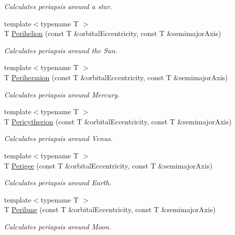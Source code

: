 \begin{DoxyCompactItemize}
\begin{DoxyCompactList}\small\item\em Calculates periapsis around a star. \end{DoxyCompactList}\item 
{\footnotesize template$<$typename T $>$ }\\T \hyperlink{group___periapsis_ga941d285e3a0b48ada9c9f60925ff63c2}{Perihelion} (const T \&orbital\+Eccentricity, const T \&semimajor\+Axis)
\begin{DoxyCompactList}\small\item\em Calculates periapsis around the Sun. \end{DoxyCompactList}\item 
{\footnotesize template$<$typename T $>$ }\\T \hyperlink{group___periapsis_ga9562e9cbfd73019ae9cdaa643b843d63}{Perihermion} (const T \&orbital\+Eccentricity, const T \&semimajor\+Axis)
\begin{DoxyCompactList}\small\item\em Calculates periapsis around Mercury. \end{DoxyCompactList}\item 
{\footnotesize template$<$typename T $>$ }\\T \hyperlink{group___periapsis_gaa270e364cbbd7d3d6212872df484926f}{Pericytherion} (const T \&orbital\+Eccentricity, const T \&semimajor\+Axis)
\begin{DoxyCompactList}\small\item\em Calculates periapsis around Venus. \end{DoxyCompactList}\item 
{\footnotesize template$<$typename T $>$ }\\T \hyperlink{group___periapsis_gae2d053caf69cb0b4c3207064a2ab143a}{Perigee} (const T \&orbital\+Eccentricity, const T \&semimajor\+Axis)
\begin{DoxyCompactList}\small\item\em Calculates periapsis around Earth. \end{DoxyCompactList}\item 
{\footnotesize template$<$typename T $>$ }\\T \hyperlink{group___periapsis_ga2cc7ab05e18d32c94d8d74972e032793}{Perilune} (const T \&orbital\+Eccentricity, const T \&semimajor\+Axis)
\begin{DoxyCompactList}\small\item\em Calculates periapsis around Moon. \end{DoxyCompactList}\item 

\end{DoxyCompactItemize}
